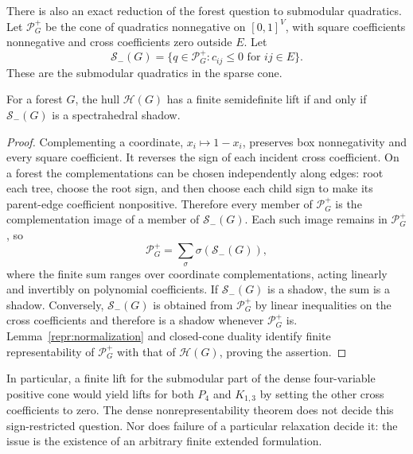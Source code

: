 There is also an exact reduction of the forest question to submodular
quadratics. Let $\mathcal P_G^+$ be the cone of quadratics nonnegative on
$[0,1]^V$, with square coefficients nonnegative and cross coefficients
zero outside $E$. Let
\[
 \mathcal S_-(G)=\{q\in\mathcal P_G^+:c_{ij}\leq0\text{ for }ij\in E\}.
\]
These are the submodular quadratics in the sparse cone.

\begin{proposition}\label{graph:forest-submodular}
For a forest $G$, the hull $\mathcal H(G)$ has a finite semidefinite lift
if and only if $\mathcal S_-(G)$ is a spectrahedral shadow.
\end{proposition}
\begin{proof}
Complementing a coordinate, $x_i\mapsto1-x_i$, preserves box nonnegativity
and every square coefficient. It reverses the sign of each incident cross
coefficient. On a forest the complementations can be chosen independently
along edges: root each tree, choose the root sign, and then choose each
child sign to make its parent-edge coefficient nonpositive. Therefore
every member of $\mathcal P_G^+$ is the complementation image of a member
of $\mathcal S_-(G)$. Each such image remains in $\mathcal P_G^+$, so
\[
 \mathcal P_G^+=\sum_\sigma \sigma(\mathcal S_-(G)),
\]
where the finite sum ranges over coordinate complementations, acting
linearly and invertibly on polynomial coefficients.
If $\mathcal S_-(G)$ is a shadow, the sum is a shadow. Conversely,
$\mathcal S_-(G)$ is obtained from $\mathcal P_G^+$ by linear inequalities
on the cross coefficients and therefore is a shadow whenever
$\mathcal P_G^+$ is. Lemma~\ref{repr:normalization} and closed-cone duality
identify finite representability of $\mathcal P_G^+$ with that of
$\mathcal H(G)$, proving the assertion.
\end{proof}

In particular, a finite lift for the submodular part of the dense
four-variable positive cone would yield lifts for both $P_4$ and
$K_{1,3}$ by setting the other cross coefficients to zero. The dense
nonrepresentability theorem does not decide this sign-restricted question.
Nor does failure of a particular relaxation decide it: the issue is the
existence of an arbitrary finite extended formulation.
